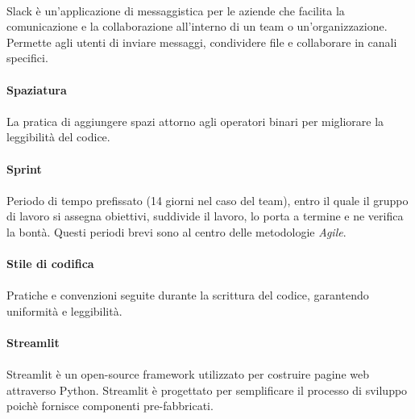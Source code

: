 \documentclass[10pt, a4paper]{article}
\begin{document}
\paragraph{}Slack è un’applicazione di messaggistica per le aziende che facilita la comunicazione e la collaborazione all’interno di un team o un’organizzazione. Permette agli utenti di inviare messaggi, condividere file e collaborare in canali specifici. 

\vspace{2em}
\paragraph{Spaziatura}\noindent\hrulefill
\paragraph{}La pratica di aggiungere spazi attorno agli operatori binari per migliorare la leggibilità del codice.


\vspace{2em}
\paragraph{Sprint}\noindent\hrulefill
\paragraph{}Periodo di tempo prefissato (14 giorni nel caso del team), entro il quale il gruppo di lavoro si assegna obiettivi, suddivide il lavoro, lo porta a termine e ne verifica la bontà. Questi periodi brevi sono al centro delle metodologie \textit{Agile\pg}.

\vspace{2em}
\paragraph{Stile di codifica}\noindent\hrulefill
\paragraph{}Pratiche e convenzioni seguite durante la scrittura del codice, garantendo uniformità e leggibilità.


\paragraph{Streamlit}\noindent\hrulefill
\paragraph{}Streamlit è un open-source framework utilizzato per costruire pagine web attraverso Python. Streamlit è progettato per semplificare il processo di sviluppo poichè fornisce componenti pre-fabbricati.
\end{document}
